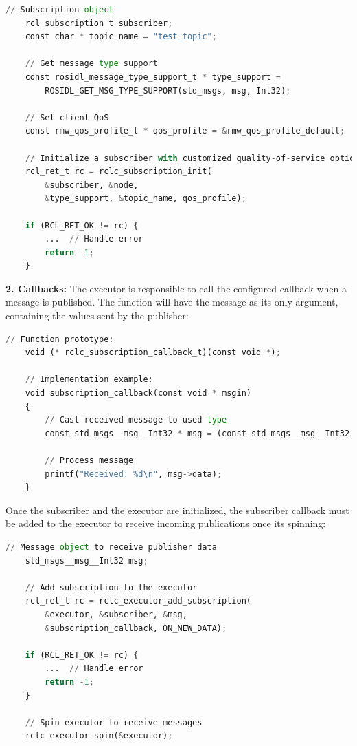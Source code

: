\begin{lstlisting}[language=Python, caption=Custom QoS]
    // Subscription object
    rcl_subscription_t subscriber;
    const char * topic_name = "test_topic";
    
    // Get message type support
    const rosidl_message_type_support_t * type_support =
        ROSIDL_GET_MSG_TYPE_SUPPORT(std_msgs, msg, Int32);
    
    // Set client QoS
    const rmw_qos_profile_t * qos_profile = &rmw_qos_profile_default;
    
    // Initialize a subscriber with customized quality-of-service options
    rcl_ret_t rc = rclc_subscription_init(
        &subscriber, &node,
        &type_support, &topic_name, qos_profile);
    
    if (RCL_RET_OK != rc) {
        ...  // Handle error
        return -1;
    }
\end{lstlisting}

\textbf{2. Callbacks:} The executor is responsible to call the configured callback when a message is published. The function will have the message as its only argument, containing the values sent by the publisher:
\begin{lstlisting}[language=Python, caption=Sub-callback decalaration]
    // Function prototype:
    void (* rclc_subscription_callback_t)(const void *);
    
    // Implementation example:
    void subscription_callback(const void * msgin)
    {
        // Cast received message to used type
        const std_msgs__msg__Int32 * msg = (const std_msgs__msg__Int32 *)msgin;
    
        // Process message
        printf("Received: %d\n", msg->data);
    }
\end{lstlisting}

Once the subscriber and the executor are initialized, the subscriber callback must be added to the executor to receive incoming publications once its spinning:
\begin{lstlisting}[language=Python, caption=Sub-callback registration]
    // Message object to receive publisher data
    std_msgs__msg__Int32 msg;
    
    // Add subscription to the executor
    rcl_ret_t rc = rclc_executor_add_subscription(
        &executor, &subscriber, &msg,
        &subscription_callback, ON_NEW_DATA);
    
    if (RCL_RET_OK != rc) {
        ...  // Handle error
        return -1;
    }
    
    // Spin executor to receive messages
    rclc_executor_spin(&executor);
\end{lstlisting}

